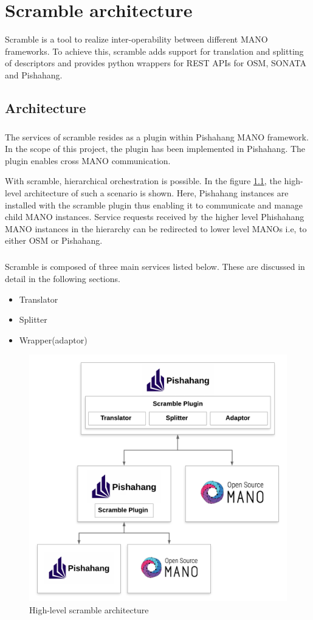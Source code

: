 \chapter{Scramble architecture}
\label{ch:Scramble architecture}

Scramble is a tool to realize inter-operability between different MANO frameworks. To achieve this, scramble adds support for translation and splitting of descriptors and provides python wrappers for REST APIs for OSM, SONATA and Pishahang.
\section{Architecture}
\paragraph{}
The services of scramble resides as a plugin within Pishahang MANO framework. In the scope of this project, the plugin has been implemented in Pishahang. The plugin enables cross MANO communication. 

With scramble, hierarchical orchestration is possible. In the figure \ref{fig:scramble-arch}, the high-level architecture of such a scenario is shown. Here, Pishahang instances are installed with the scramble plugin thus enabling it to communicate and manage child MANO instances. Service requests received by the higher level Phishahang MANO instances in the hierarchy can be redirected to lower level MANOs i.e, to either OSM or Pishahang.

\paragraph{}
Scramble is composed of three main services listed below. These are discussed in detail in the following sections.
\begin{itemize}
	\item Translator
	\item Splitter
	\item Wrapper(adaptor)
\end{itemize}


\begin{figure}[h]
	\centering
	\includegraphics[width=0.9\linewidth]{../figures/ScrambleArch}
	\caption{High-level scramble architecture}
	\label{fig:scramble-arch}
\end{figure}

